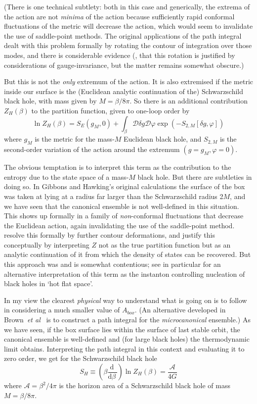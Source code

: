 \documentclass[12pt]{article}
\newcommand{\dr}[1]{\ensuremath{\mathrm{d} #1\,}}
\newcommand{\mc}[1]{\ensuremath{\mathcal{#1}}}
\newcommand{\dbd}[2]{\ensuremath{\frac{\dr{#1}}{\dr{#2}}}}
\newcommand{\be}{\begin{equation}}
\newcommand{\ee}{\end{equation}}
\begin{document}
(There is one technical subtlety: both in this case and generically, the extrema of the action are not \emph{minima} of the action because sufficiently rapid conformal fluctuations of the metric will decrease the action, which would seem to invalidate the use of saddle-point methods. The original applications of the path integral \cite{gibbonshawkingperry} dealt with this problem formally by rotating the contour of integration over those modes, and there is considerable evidence (,  that this rotation is justified by considerations of gauge-invariance, but the matter remains somewhat obscure.)

But this is not the \emph{only} extremum of the action. It is also extremised if the metric inside our surface is the (Euclidean analytic continuation of the) Schwarzschild black hole, with mass given by $M=\beta/8 \pi$. So there is an additional contribution $Z_H(\beta)$ to the partition function, given to one-loop order by
\be \label{blackholepartition}
\ln Z_H(\beta) = S_E(g_M,0) + \int_\beta \mc{D}\delta g \mc{D}\varphi \exp(- S_{2,M}[\delta g,\varphi])
\ee
where $g_M$ is the metric for the mass-$M$ Euclidean black hole, and $S_{2,M}$ is the second-order variation of the action around the extremum $(g=g_M,\varphi=0)$. 

The obvious temptation is to interpret this term as the contribution to the entropy due to the state space of a mass-$M$ black hole. But there are subtleties in doing so. In Gibbons and Hawking's original calculations the surface of the box was taken at lying at a radius far larger than the Schwarzschild radius 2$M$, and we have seen that the canonical ensemble is not well-defined in this situation. This shows up formally in a family of \emph{non}-conformal fluctuations that decrease the Euclidean action, again invalidating the use of the saddle-point method.  resolve this formally by further contour deformations, and justify this conceptually by interpreting $Z$ not as the true partition function but as an analytic continuation of it from which the density of states can be recovered. But this approach was and is somewhat contentious; see in particular  for an alternative interpretation of this term as the instanton controlling nucleation of black holes in `hot flat space'.

In my view the clearest \emph{physical} way to understand what is going on is to follow  in considering a much smaller value of $A_{box}$. (An alternative developed in Brown~\emph{et al}~\citeyear{brownetalblackhole} is to construct a path integral for the \emph{microcanonical} ensemble.) As we have seen, if the box surface lies within the surface of last stable orbit, the canonical ensemble is well-defined and (for large black holes) the thermodynamic limit obtains. Interpreting the path integral in this context and evaluating it to zero order, we get for the Schwarzschild black hole
\be
S_H \equiv \left( \beta \dbd{}{\beta} \right) \ln Z_H(\beta) = \frac{\mc{A}}{4G}
\ee
where $\mc{A}= \beta^2/4\pi$ is the horizon area of a Schwarzschild black hole of mass $M=\beta/8\pi$.
\end{document}
